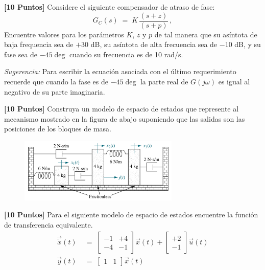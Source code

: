 \documentclass[ a4paper, twoside, 11pt]{article}
\begin{document}
\begin{problem}
\textbf{[10 Puntos]} Considere el siguiente compensador de atraso de fase: 
\[
G_C(s) \; = \; K \, \frac{(s+z)}{(s+p)} \, ,
\]
Encuentre valores para los par\'ametros $K$, $z$ y $p$ de tal manera que su as\'intota de baja frequencia sea de $+30$ dB, su as\'intota de alta frecuencia sea de $-10$ dB, y su fase sea de $-45\deg$ cuando su frecuencia es de 10 rad/s. 

\emph{Sugerencia:} Para escribir la ecuaci\'on asociada con el \'ultimo requerimiento recuerde que cuando la fase es de $-45\deg$ la parte real de $G( j \omega )$ es igual al negativo de su parte imaginaria. 

\end{problem}
\vspace{\baselineskip}

\begin{problem} \textbf{[10 Puntos]} Construya un modelo de espacio de estados que represente al mecanismo mostrado en la figura de abajo suponiendo que las salidas son las posiciones de los bloques de masa. 

\begin{figure}[htb]
\centering
\includegraphics[width=0.68\textwidth]{prob_espacio-estados.jpg}
\end{figure}

\end{problem}
\vspace{\baselineskip}

\begin{problem}
\textbf{[10 Puntos]} Para el siguiente modelo de espacio de estados encuentre la funci\'on de transferencia equivalente. 
\begin{align*}
\vec{\dot{x}}(t) \; & = \; 
\left[ \begin{array}{cc}
-1 & +4 \\ -4 & -1
\end{array} \right] \vec{x}(t) + 
\left[ \begin{array}{c}
+2 \\ -1
\end{array} \right] \vec{u}(t) \\[2ex]
\vec{y}(t) \; & = \; 
\left[ \begin{array}{cc}
1 & 1
\end{array} \right] \vec{x}(t)
\end{align*}

\end{problem}
\vspace{\baselineskip}
\end{document}
